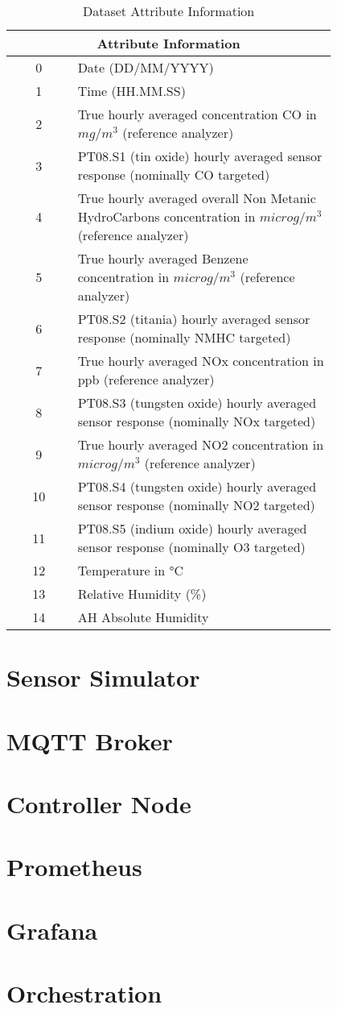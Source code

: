 \begin{table}[!h]
\begin{tabular}{|c|p{0.8\linewidth}|}
    \hline
    \multicolumn{2}{|c|}{\textbf{Attribute Information}} \\
    \hline
    \hline
    0& Date (DD/MM/YYYY) \\ \hline
    1& Time (HH.MM.SS) \\ \hline
    2& True hourly averaged concentration CO in $mg/m^3$ (reference analyzer) \\ \hline
    3& PT08.S1 (tin oxide) hourly averaged sensor response (nominally CO targeted) \\ \hline
    4& True hourly averaged overall Non Metanic HydroCarbons concentration in $microg/m^3$ (reference analyzer) \\ \hline
    5& True hourly averaged Benzene concentration in $microg/m^3$ (reference analyzer) \\ \hline
    6& PT08.S2 (titania) hourly averaged sensor response (nominally NMHC targeted) \\ \hline
    7& True hourly averaged NOx concentration in ppb (reference analyzer) \\ \hline
    8& PT08.S3 (tungsten oxide) hourly averaged sensor response (nominally NOx targeted) \\ \hline
    9& True hourly averaged NO2 concentration in $microg/m^3$ (reference analyzer) \\ \hline
    10& PT08.S4 (tungsten oxide) hourly averaged sensor response (nominally NO2 targeted) \\ \hline
    11& PT08.S5 (indium oxide) hourly averaged sensor response (nominally O3 targeted) \\ \hline
    12& Temperature in °C \\ \hline
    13& Relative Humidity (\%) \\ \hline
    14& AH Absolute Humidity  \\ \hline
\end{tabular}
\centering
\caption{Dataset Attribute Information}
\label{fig:dataset_attri}
\end{table}

\section{Sensor Simulator}

\section{MQTT Broker}

\section{Controller Node}

\section{Prometheus}

\section{Grafana}

\section{Orchestration}
